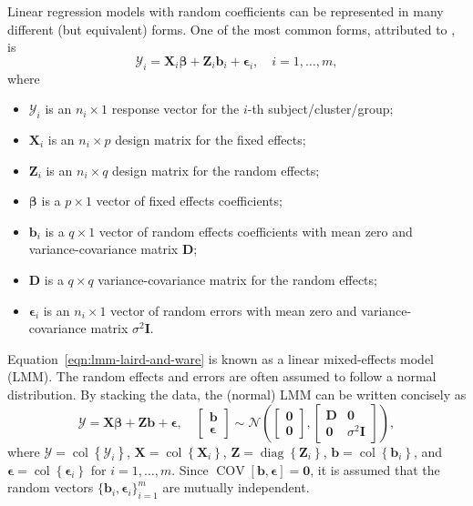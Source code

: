 \documentclass{article}\usepackage[]{graphicx}\usepackage[]{color}
\newcommand{\diag}{\operatorname{diag}}
\newcommand{\col}{\operatorname{col}}
\newcommand{\COV}{\operatorname{COV}}
\begin{document}
Linear regression models with random coefficients can be represented in many different (but equivalent) forms.  One of the most common forms, attributed to \citet{laird-random-1982}, is
\begin{equation}
\label{eqn:lmm-laird-and-ware}
  \bm{\mathcal{Y}}_i = \bm{X}_i\bm{\beta} + \bm{Z}_i\bm{b}_i + \bm{\epsilon}_i, \quad i = 1, \dotsc, m,
\end{equation}
where
\begin{itemize}
  \item $\bm{\mathcal{Y}}_i$ is an $n_i \times 1$ response vector for the $i$-th subject/cluster/group;
  \item $\bm{X}_i$ is an $n_i \times p$ design matrix for the fixed effects;
  \item $\bm{Z}_i$ is an $n_i \times q$ design matrix for the random effects;
  \item $\bm{\beta}$ is a $p \times 1$ vector of fixed effects coefficients;
  \item $\bm{b}_i$ is a $q \times 1$ vector of random effects coefficients with mean zero and variance-covariance matrix $\bm{D}$;
  \item $\bm{D}$ is a $q \times q$ variance-covariance matrix for the random effects;
  \item $\bm{\epsilon}_i$ is an $n_i \times 1$ vector of random errors with mean zero and variance-covariance matrix $\sigma^2\bm{I}$.
\end{itemize}
Equation~\eqref{eqn:lmm-laird-and-ware} is known as a linear mixed-effects model (LMM).  The random effects and errors are often assumed to follow a normal distribution.  By stacking the data, the (normal) LMM can be written concisely as
\begin{equation}
\label{eqn:lmm-stacked}
    \bm{\mathcal{Y}} = \bm{X}\bm{\beta} + \bm{Z}\bm{b} + \bm{\epsilon}, \quad
      \begin{bmatrix}
        \bm{b} \\
        \bm{\epsilon}
      \end{bmatrix} \sim
      \mathcal{N}\left(\begin{bmatrix}
        \bm{0} \\
        \bm{0}
      \end{bmatrix}, \begin{bmatrix}
        \bm{D} & \bm{0} \\
        \bm{0} & \sigma^2\bm{I}
      \end{bmatrix}\right),
\end{equation}
where $\bm{\mathcal{Y}} = \col\left\{\bm{\mathcal{Y}}_i\right\}$, $\bm{X} = \col\left\{\bm{X}_i\right\}$, $\bm{Z} = \diag\left\{\bm{Z}_i\right\}$, $\bm{b} = \col\left\{\bm{b}_i\right\}$, and $\bm{\epsilon} = \col\left\{\bm{\epsilon}_i\right\}$ for $i = 1, \dotsc, m$.  Since $\COV\left[\bm{b}, \bm{\epsilon}\right] = \bm{0}$, it is assumed that the random vectors $\big\{ \bm{b}_i, \bm{\epsilon}_i \big\}_{i=1}^m$ are mutually independent.
\end{document}
